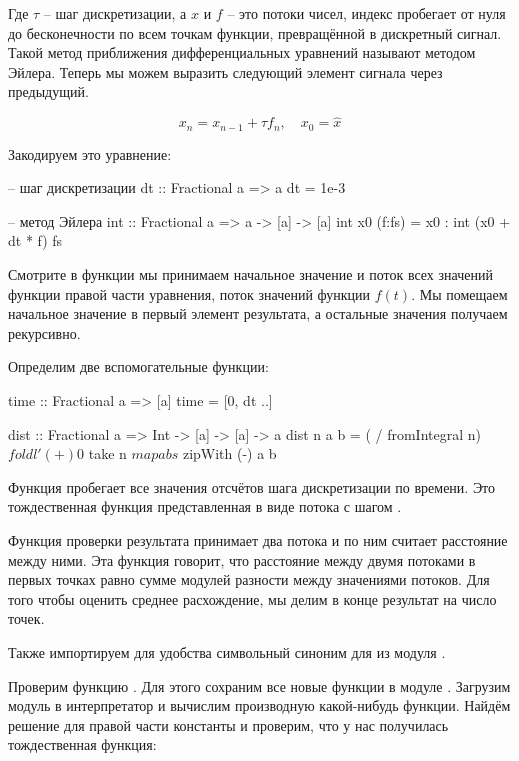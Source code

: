 Где $\tau$ -- шаг дискретизации, а $x$ и $f$ -- это потоки чисел, индекс
 пробегает от нуля до бесконечности по всем точкам функции,
превращённой в дискретный сигнал. Такой метод приближения
дифференциальных уравнений называют методом Эйлера. Теперь мы можем
выразить следующий элемент сигнала через предыдущий.

\[x_n = x_{n-1} + \tau f_n, \quad x_0 = \hat{x}\]

Закодируем это уравнение:


\begin{code}
-- шаг дискретизации
dt :: Fractional a => a
dt = 1e-3

-- метод Эйлера
int :: Fractional a => a -> [a] -> [a]
int x0 (f:fs) = x0 : int (x0 + dt * f) fs
\end{code}

Смотрите в функции  мы принимаем начальное значение  и
поток всех значений функции правой части уравнения, поток значений
функции $f(t)$. Мы помещаем начальное значение в первый элемент
результата, а остальные значения получаем рекурсивно.

Определим две вспомогательные функции:


\begin{code}
time :: Fractional a => [a]
time = [0, dt ..]

dist :: Fractional a => Int -> [a] -> [a] -> a
dist n a b = ( / fromIntegral n) $ 
    foldl' (+) 0 $ take n $ map abs $ zipWith (-) a b
\end{code}

Функция  пробегает все значения отсчётов шага дискретизации по
времени. Это тождественная функция представленная в виде потока с шагом
.

Функция проверки результата  принимает два потока и по ним
считает расстояние между ними. Эта функция говорит, что расстояние между
двумя потоками в  первых точках равно сумме модулей разности между
значениями потоков. Для того чтобы оценить среднее расхождение, мы делим
в конце результат на число точек.

Также импортируем для удобства символьный синоним для  из
модуля .



Проверим функцию . Для этого сохраним все новые функции в модуле
. Загрузим модуль в интерпретатор и вычислим производную
какой-нибудь функции. Найдём решение для правой части константы и
проверим, что у нас получилась тождественная функция:


